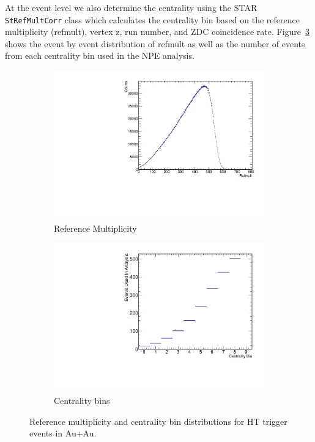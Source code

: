 At the event level we also determine the centrality using the STAR \texttt{StRefMultCorr} class which calculates the centrality bin based on the reference multiplicity (refmult), vertex z, run number, and ZDC coincidence rate. Figure~\ref{fig:EventCent} shows the event by event distribution of refmult as well as the number of events from each centrality bin used in the NPE analysis.
 
\begin{figure}[htbp]
    \begin{subfigure}{0.5\textwidth}
        \includegraphics[width=\textwidth]{Plots/NPE/RefmultNPE18.pdf}
        \caption{Reference Multiplicity}
        \label{fig:refmult}
    \end{subfigure}
    \begin{subfigure}{0.5\textwidth}
        \includegraphics[width=\textwidth]{Plots/NPE/Centrality_dist.pdf}
        \caption{Centrality bins}
        \label{fig:centdist}
    \end{subfigure}
\caption[Refmult and Centrality Distributions]{Reference multiplicity and centrality bin distributions for HT trigger events in Au+Au.}
\label{fig:EventCent}
\end{figure}


